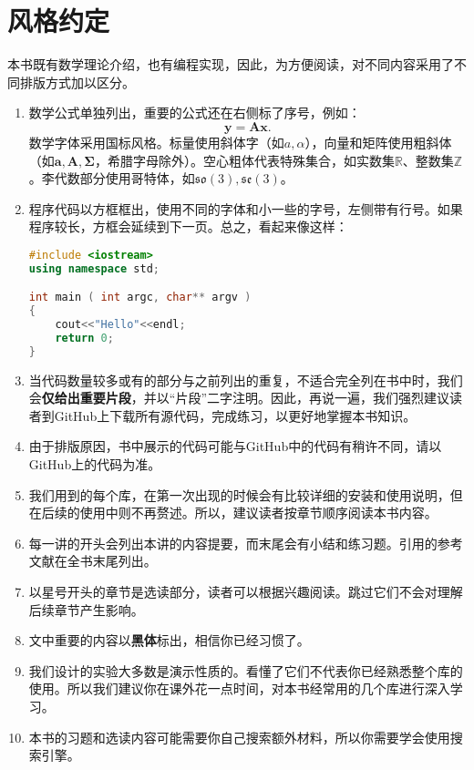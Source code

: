 \section{风格约定}
本书既有数学理论介绍，也有编程实现，因此，为方便阅读，对不同内容采用了不同排版方式加以区分。
\begin{enumerate}
\item 数学公式单独列出，重要的公式还在右侧标了序号，例如：
\begin{equation}
 \bm{y} =\bm{A}\bm{x}.
\end{equation}
数学字体采用国标风格。标量使用斜体字（如$a,\alpha$），向量和矩阵使用粗斜体（如$\bm{a}, \bm{A},\boldsymbol{\Sigma}$，希腊字母除外）。空心粗体代表特殊集合，如实数集$\mathbb{R}$、整数集$\mathbb{Z}$。李代数部分使用哥特体，如$\mathfrak{so}(3),\mathfrak{se}(3)$。
\item 程序代码以方框框出，使用不同的字体和小一些的字号，左侧带有行号。如果程序较长，方框会延续到下一页。总之，看起来像这样：
\begin{lstlisting}[language=C++,caption=示例代码]
#include <iostream>
using namespace std;

int main ( int argc, char** argv )
{
	cout<<"Hello"<<endl;
	return 0;
}
\end{lstlisting}

\item 当代码数量较多或有的部分与之前列出的重复，不适合完全列在书中时，我们会\textbf{仅给出重要片段}，并以“片段”二字注明。因此，再说一遍，我们强烈建议读者到GitHub上下载所有源代码，完成练习，以更好地掌握本书知识。

\item 由于排版原因，书中展示的代码可能与GitHub中的代码有稍许不同，请以GitHub上的代码为准。

\item 我们用到的每个库，在第一次出现的时候会有比较详细的安装和使用说明，但在后续的使用中则不再赘述。所以，建议读者按章节顺序阅读本书内容。

\item 每一讲的开头会列出本讲的内容提要，而末尾会有小结和练习题。引用的参考文献在全书末尾列出。

\item 以星号开头的章节是选读部分，读者可以根据兴趣阅读。跳过它们不会对理解后续章节产生影响。

\item 文中重要的内容以\textbf{黑体}标出，相信你已经习惯了。

\item 我们设计的实验大多数是演示性质的。看懂了它们不代表你已经熟悉整个库的使用。所以我们建议你在课外花一点时间，对本书经常用的几个库进行深入学习。

\item 本书的习题和选读内容可能需要你自己搜索额外材料，所以你需要学会使用搜索引擎。
\end{enumerate}

